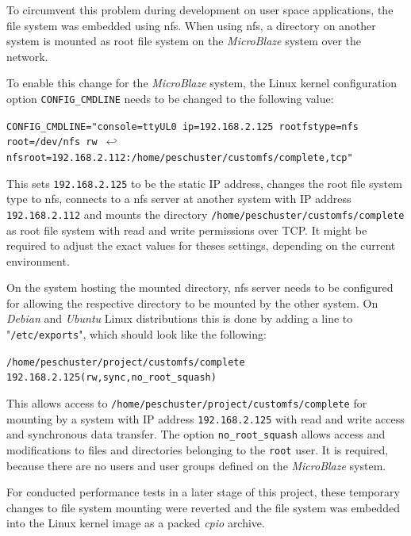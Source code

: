 To circumvent this problem during development on user space applications, the file system was embedded using \gls{nfs}. When using \gls{nfs}, a directory on another system is mounted as root file system on the \textit{MicroBlaze} system over the network.

To enable this change for the \textit{MicroBlaze} system, the Linux kernel configuration option \texttt{CONFIG\_CMDLINE} needs to be changed to the following value:

\texttt{CONFIG\_CMDLINE="console=ttyUL0 ip=192.168.2.125 rootfstype=nfs root=/dev/nfs rw $ \hookleftarrow$\\  nfsroot=192.168.2.112:/home/peschuster/customfs/complete,tcp"} %

This sets \texttt{192.168.2.125} to be the static IP address, changes the root file system type to \gls{nfs}, connects to a \gls{nfs} server at another system with IP address \texttt{192.168.2.112} and mounts the directory \texttt{/home/peschuster/customfs/complete} as root file system with read and write permissions over TCP. It might be required to adjust the exact values for theses settings, depending on the current environment.

On the system hosting the mounted directory, \gls{nfs} server needs to be configured for allowing the respective directory to be mounted by the other system. On \textit{Debian} and \textit{Ubuntu} Linux distributions this is done by adding a line to "\texttt{/etc/exports}", which should look like the following: 

\texttt{/home/peschuster/project/customfs/complete	192.168.2.125(rw,sync,no\_root\_squash)}

This allows access to \texttt{/home/peschuster/project/customfs/complete} for mounting by a system with IP address \texttt{192.168.2.125} with read and write access and synchronous data transfer. The option \texttt{no\_root\_squash} allows access and modifications to files and directories belonging to the \texttt{root} user. It is required, because there are no users and user groups defined on the \textit{MicroBlaze} system.

For conducted performance tests in a later stage of this project, these temporary changes to file system mounting were reverted and the file system was embedded into the Linux kernel image as a packed \textit{cpio} archive.